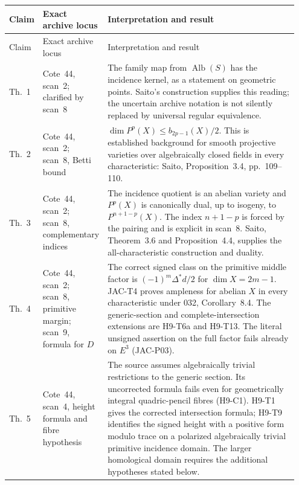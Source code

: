 \documentclass[11pt,a4paper]{article}
\begin{document}
\begingroup
\small
\setlength{\tabcolsep}{4pt}
\renewcommand{\arraystretch}{1.15}
\begin{longtable}{@{}p{0.08\linewidth}p{0.19\linewidth}p{0.68\linewidth}@{}}
\toprule
Claim & Exact archive locus & Interpretation and result\\
\midrule
\endfirsthead
\toprule
Claim & Exact archive locus & Interpretation and result\\
\midrule
\endhead
Th.~1 & Cote~44, scan~2; clarified by scan~8 &
The family map from $\operatorname{Alb}(S)$ has the incidence
kernel, as a statement on geometric points. Saito's construction
supplies this reading; the uncertain archive notation is not
silently replaced by universal regular equivalence.\\

Th.~2 & Cote~44, scan~2; scan~8, Betti bound &
$\dim P^p(X)\le b_{2p-1}(X)/2$. This is established background for
smooth projective varieties over algebraically closed fields in
every characteristic: Saito, Proposition~3.4, pp.~109--110.\\

Th.~3 & Cote~44, scan~2; scan~8, complementary indices &
The incidence quotient is an abelian variety and $P^p(X)$ is
canonically dual, up to isogeny, to $P^{n+1-p}(X)$.
The index $n+1-p$ is forced by the pairing and is explicit in
scan~8. Saito, Theorem~3.6 and Proposition~4.4, supplies the
all-characteristic construction and duality.\\

Th.~4 & Cote~44, scan~2; scan~8, primitive margin; scan~9, formula for $D$ &
The correct signed class on the primitive middle factor is
$(-1)^m\Delta^*d/2$ for $\dim X=2m-1$.
JAC-T4 proves ampleness for abelian $X$ in every characteristic
under 032, Corollary~8.4. The generic-section and complete-intersection
extensions are H9-T6a and H9-T13. The literal unsigned assertion
on the full factor fails already on $E^3$ (JAC-P03).\\

Th.~5 & Cote~44, scan~4, height formula and fibre hypothesis &
The source assumes algebraically trivial restrictions to the generic
section. Its uncorrected formula fails even for geometrically
integral quadric-pencil fibres (H9-C1). H9-T1 gives the corrected
intersection formula; H9-T9 identifies the signed height with a
positive form modulo trace on a polarized algebraically trivial
primitive incidence domain. The larger homological domain requires
the additional hypotheses stated below.\\


\end{longtable}
\end{document}
